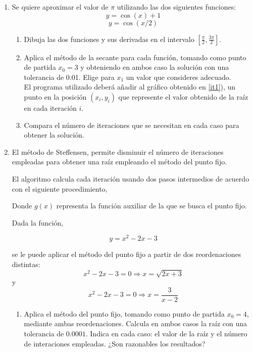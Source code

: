 \begin{paracol}{2}
\begin{enumerate}
\item Se quiere aproximar el valor de $\pi$ utilizando las dos siguientes funciones:
\begin{equation*}
y=\cos(x)+1
\end{equation*}
\begin{equation*}
y=\cos(x/2)
\end{equation*}
\begin{enumerate}
\item \label{it1}Dibuja las dos funciones y sus derivadas en el intervalo $[\frac{\pi}{2},\frac{3\pi}{2}]$.
\item Aplica el método de la secante para cada función, tomando como punto de partida  $x_0=3$ y obteniendo en ambos caso la solución con una tolerancia de 0.01. Elige para $x_1$ un valor que consideres adecuado.\\
El programa utilizado deberá añadir al gráfico obtenido en  \ref{it1}), un punto en la posición $(x_i,y_i)$ que represente el valor obtenido de la raíz en cada iteración $i$.
\item Compara el número de iteraciones que se necesitan en cada caso para obtener la solución.
\end{enumerate}

\item El método de Steffensen, permite disminuir el número de iteraciones empleadas para obtener una raíz empleando el método del punto fijo.

El algoritmo calcula cada iteración usando dos pasos intermedios de acuerdo con el siguiente procedimiento,


Donde $g(x)$ representa la función auxiliar de la que se busca el punto fijo.


Dada la función,

\begin{equation*}
y= x^2-2x-3
\end{equation*} 

se le puede aplicar el método del punto fijo a  partir de dos reordenaciones distintas:
\begin{equation}
x^2-2x-3=0 \Rightarrow x=\sqrt{2x+3}
\end{equation}
y
\begin{equation}
x^2-2x-3=0 \Rightarrow x=\frac{3}{x-2}
\end{equation}
\begin{enumerate}
\item Aplica el método del punto fijo, tomando como punto de partida $x_0=4$, mediante ambas reordenaciones. Calcula en ambos casos la raíz con una tolerancia de $0.0001$. Indica en cada caso: el valor de la raíz y el número de interaciones empleadas.  ¿Son razonables los resultados?


\end{enumerate}
\end{enumerate}
\end{paracol}
